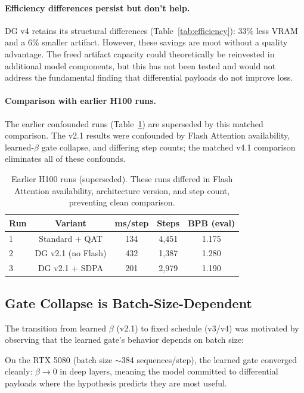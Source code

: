 \documentclass[11pt]{article}
\begin{document}
\paragraph{Efficiency differences persist but don't help.} DG v4 retains its structural differences (Table~\ref{tab:efficiency}): 33\% less VRAM and a 6\% smaller artifact. However, these savings are moot without a quality advantage. The freed artifact capacity could theoretically be reinvested in additional model components, but this has not been tested and would not address the fundamental finding that differential payloads do not improve loss.

\paragraph{Comparison with earlier H100 runs.} The earlier confounded runs (Table~\ref{tab:h100_early}) are superseded by this matched comparison. The v2.1 results were confounded by Flash Attention availability, learned-$\beta$ gate collapse, and differing step counts; the matched v4.1 comparison eliminates all of these confounds.

\begin{table}[H]
\centering
\caption{Earlier H100 runs (superseded). These runs differed in Flash Attention availability, architecture version, and step count, preventing clean comparison.}
\label{tab:h100_early}
\begin{tabular}{@{}lcccc@{}}
\toprule
Run & Variant & ms/step & Steps & BPB (eval) \\
\midrule
1 & Standard + QAT & 134 & 4{,}451 & 1.175 \\
2 & DG v2.1 (no Flash) & 432 & 1{,}387 & 1.280 \\
3 & DG v2.1 + SDPA   & 201 & 2{,}979 & 1.190 \\
\bottomrule
\end{tabular}
\end{table}

\subsection{Gate Collapse is Batch-Size-Dependent}
\label{sec:gate_collapse}

The transition from learned $\beta$ (v2.1) to fixed schedule (v3/v4) was motivated by observing that the learned gate's behavior depends on batch size:

On the RTX 5080 (batch size $\sim$384 sequences/step), the learned gate converged cleanly: $\beta \to 0$ in deep layers, meaning the model committed to differential payloads where the hypothesis predicts they are most useful.
\end{document}
